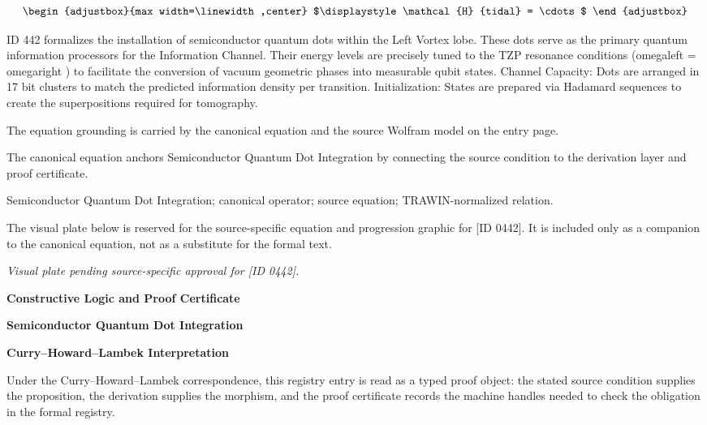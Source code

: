 \[
\begin{adjustbox}{max width=\linewidth,center}
$\displaystyle
\mathcal{H} {tidal} = \cdots
$
\end{adjustbox}
\]

ID 442 formalizes the installation of semiconductor quantum dots within the Left Vortex lobe. These dots serve as the primary quantum information processors for the Information Channel. Their energy levels are precisely tuned to the TZP resonance conditions (omegaleft = omegaright ) to facilitate the conversion of vacuum geometric phases into measurable qubit states. Channel Capacity: Dots are arranged in 17 bit clusters to match the predicted information density per transition. Initialization: States are prepared via Hadamard sequences to create the superpositions required for tomography.

The equation grounding is carried by the canonical equation and the source Wolfram model on the entry page.

The canonical equation anchors Semiconductor Quantum Dot Integration by connecting the source condition to the derivation layer and proof certificate.

Semiconductor Quantum Dot Integration; canonical operator; source equation; TRAWIN-normalized relation.
\endgroup

\begingroup\footnotesize\sloppy
The visual plate below is reserved for the source-specific equation and progression graphic for [ID 0442]. It is included only as a companion to the canonical equation, not as a substitute for the formal text.
\par\endgroup
\begingroup\footnotesize\itshape
Visual plate pending source-specific approval for [ID 0442].
\par\endgroup

\clearpage
\begingroup\tzpsupportsetup
\noindent\textbf{\fontsize{10.8pt}{12.8pt}\selectfont [ID 0442] Constructive Logic and Proof Certificate}\par
\noindent\textbf{\fontsize{10pt}{12pt}\selectfont Semiconductor Quantum Dot Integration}\par
\vspace{0.45em}
\begingroup
\footnotesize
\setlength{\parskip}{0.22em}
\setlength{\parindent}{0pt}
\noindent\textbf{Curry--Howard--Lambek Interpretation}\par
Under the Curry--Howard--Lambek correspondence, this registry entry is read as a typed proof
object: the stated source condition supplies the proposition, the derivation supplies the
morphism, and the proof certificate records the machine handles needed to check the obligation
in the formal registry.

